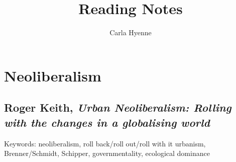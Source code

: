 \documentclass{article}
\title{Reading Notes}
\author{Carla Hyenne }
\begin{document}
\maketitle

\tableofcontents

\pagebreak

\section{Neoliberalism}

\subsection{Roger Keith, \textit{Urban Neoliberalism: Rolling with the changes in a globalising world}}

Keywords: neoliberalism, roll back/roll out/roll with it urbanism, Brenner/Schmidt, Schipper, governmentality, ecological dominance
\end{document}
